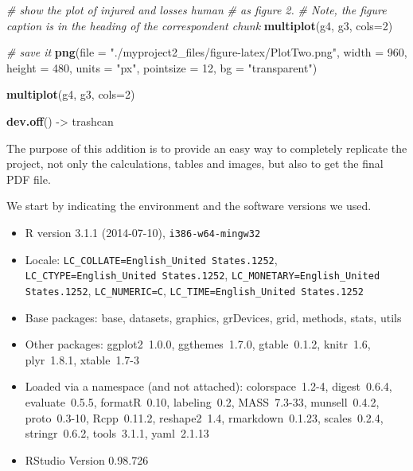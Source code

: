 \documentclass[12pt,spanish, american,b4paper, onecolumn, lmargin=1cm, rmargin=1cm, tmargin=1cm, bmargin=2cm,]{article}
\newenvironment{Shaded}{}{}
\newcommand{\KeywordTok}[1]{\textbf{{#1}}}
\newcommand{\DataTypeTok}[1]{\textcolor[rgb]{0.50,0.00,0.00}{{#1}}}
\newcommand{\DecValTok}[1]{\textcolor[rgb]{0.00,0.00,1.00}{{#1}}}
\newcommand{\StringTok}[1]{\textcolor[rgb]{0.87,0.00,0.00}{{#1}}}
\newcommand{\CommentTok}[1]{\textcolor[rgb]{0.50,0.50,0.50}{\textit{{#1}}}}
\newcommand{\NormalTok}[1]{{#1}}
\begin{document}
\begin{Shaded}
\begin{Highlighting}[]
\CommentTok{# show the plot of injured and losses human }
\CommentTok{# as figure 2.}
\CommentTok{# Note, the figure caption is in the heading of the correspondent chunk }
\KeywordTok{multiplot}\NormalTok{(g4, g3, }\DataTypeTok{cols=}\DecValTok{2}\NormalTok{)}

\CommentTok{# save it}
\KeywordTok{png}\NormalTok{(}\DataTypeTok{file =} \StringTok{"./myproject2_files/figure-latex/PlotTwo.png"}\NormalTok{, }
    \DataTypeTok{width =} \DecValTok{960}\NormalTok{, }
    \DataTypeTok{height =} \DecValTok{480}\NormalTok{, }
    \DataTypeTok{units =} \StringTok{"px"}\NormalTok{, }
    \DataTypeTok{pointsize =} \DecValTok{12}\NormalTok{,}
    \DataTypeTok{bg =} \StringTok{"transparent"}\NormalTok{)}

\KeywordTok{multiplot}\NormalTok{(g4, g3, }\DataTypeTok{cols=}\DecValTok{2}\NormalTok{)}

\KeywordTok{dev.off}\NormalTok{() ->}\StringTok{ }\NormalTok{trashcan}
\end{Highlighting}
\end{Shaded}

\newpage


The purpose of this addition is to provide an easy way to completely
replicate the project, not only the calculations, tables and images, but
also to get the final PDF file.

We start by indicating the environment and the software versions we
used.

\begin{itemize}\raggedright
  \item R version 3.1.1 (2014-07-10), \verb|i386-w64-mingw32|
  \item Locale: \verb|LC_COLLATE=English_United States.1252|, \verb|LC_CTYPE=English_United States.1252|, \verb|LC_MONETARY=English_United States.1252|, \verb|LC_NUMERIC=C|, \verb|LC_TIME=English_United States.1252|
  \item Base packages: base, datasets, graphics, grDevices, grid,
    methods, stats, utils
  \item Other packages: ggplot2~1.0.0, ggthemes~1.7.0, gtable~0.1.2,
    knitr~1.6, plyr~1.8.1, xtable~1.7-3
  \item Loaded via a namespace (and not attached): colorspace~1.2-4,
    digest~0.6.4, evaluate~0.5.5, formatR~0.10, labeling~0.2,
    MASS~7.3-33, munsell~0.4.2, proto~0.3-10, Rcpp~0.11.2, reshape2~1.4,
    rmarkdown~0.1.23, scales~0.2.4, stringr~0.6.2, tools~3.1.1,
    yaml~2.1.13
  \item RStudio Version 0.98.726
\end{itemize}
\end{document}
